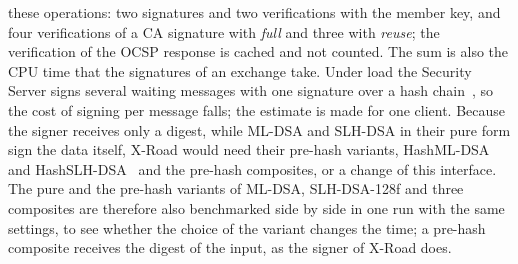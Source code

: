 \documentclass[conference,a4paper]{IEEEtran}
\newcommand{\newtext}[1]{{\color{blue}#1}}
\begin{document}
{{these operations: two signatures and two verifications with the member key, and four verifications
of a CA signature with \emph{full} and three with \emph{reuse}; the verification of the OCSP response
is cached and not counted. The sum is also the CPU time that the signatures of an exchange take.
Under load the Security Server signs several waiting messages with one signature over a hash
chain~\cite{xroadarcss}, so the cost of signing per message falls; the estimate is made for one
client.} \newtext{Because the signer receives only a digest, while ML-DSA and SLH-DSA in their pure
form sign the data itself, X-Road would need their pre-hash variants, HashML-DSA and
HashSLH-DSA~\cite{fips204,fips205} and the pre-hash composites, or a change of this interface. The
pure and the pre-hash variants of ML-DSA, SLH-DSA-128f and three composites are therefore also
benchmarked side by side in one run with the same settings, to see whether the choice of the
variant changes the time; a pre-hash composite receives the digest of the input, as the signer of
X-Road does.}

}
\end{document}
